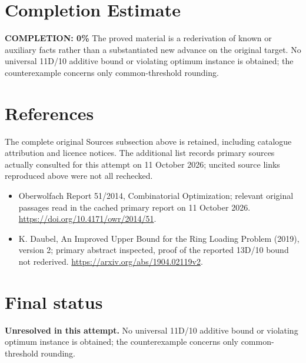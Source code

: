 \documentclass[11pt]{article}
\begin{document}
\section{Completion Estimate}
\noindent\textbf{COMPLETION: 0\%}
The proved material is a rederivation of known or auxiliary facts rather than a substantiated new advance on the original target. No universal 11D/10 additive bound or violating optimum instance is obtained; the counterexample concerns only common-threshold rounding.
\section{References}
The complete original Sources subsection above is retained, including catalogue attribution and licence notices. The additional list records primary sources actually consulted for this attempt on 11 October 2026; uncited source links reproduced above were not all rechecked.
\begin{itemize}
\item Oberwolfach Report 51/2014, Combinatorial Optimization; relevant original passages read in the cached primary report on 11 October 2026. \url{https://doi.org/10.4171/owr/2014/51}.
\item K. Daubel, An Improved Upper Bound for the Ring Loading Problem (2019), version 2; primary abstract inspected, proof of the reported 13D/10 bound not rederived. \url{https://arxiv.org/abs/1904.02119v2}.
\end{itemize}
\section{Final status}
\textbf{Unresolved in this attempt.} No universal 11D/10 additive bound or violating optimum instance is obtained; the counterexample concerns only common-threshold rounding.
\end{document}
